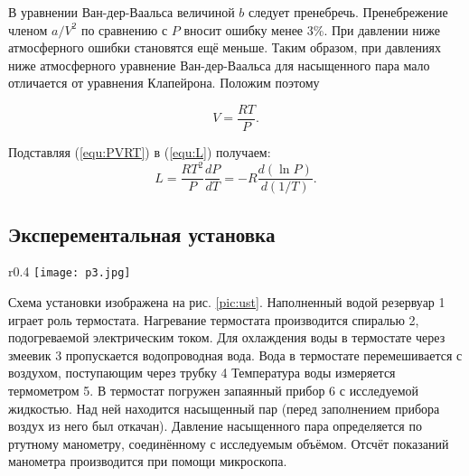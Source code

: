 В уравнении Ван-дер-Ваальса величиной $b$ следует пренебречь. Пренебрежение членом $a/V^2$ по сравнению с $P$ вносит ошибку менее 3\%. При давлении ниже атмосферного ошибки становятся ещё меньше. Таким образом, при давлениях ниже атмосферного уравнение Ван-дер-Ваальса для насыщенного пара мало отличается от уравнения Клапейрона. Положим поэтому

\begin{equation}
    V = \frac{RT}{P}.
    \label{equ:PVRT}
\end{equation}

Подставляя (\ref*{equ:PVRT}) в (\ref*{equ:L}) получаем:
\begin{equation}
    L = \frac{RT^2}{P}\frac{dP}{dT} = - R \frac{d(\ln P)}{d(1/T)}.
\end{equation}

\subsection{Эксперементальная установка}
\begin{wrapfigure}{r}{0.4\linewidth}
    \centering
    \texttt{[image: p3.jpg]}
    \caption{Схема установки для определения теплоты испарения}
    \label{pic:ust}
\end{wrapfigure}
Схема установки изображена на рис. \ref*{pic:ust}. Наполненный водой резервуар 1 играет роль термостата. Нагревание термостата
производится спиралью 2, подогреваемой электрическим током. Для охлаждения воды в термостате через змеевик 3 пропускается водопроводная вода. Вода в термостате перемешивается с воздухом, поступающим через трубку 4
Температура воды измеряется термометром 5. В термостат погружен запаянный прибор 6 с исследуемой жидкостью. Над ней находится насыщенный пар (перед заполнением прибора воздух из него был откачан). Давление насыщенного пара определяется по ртутному манометру, соединённому с исследуемым объёмом. Отсчёт показаний
манометра производится при помощи микроскопа.
